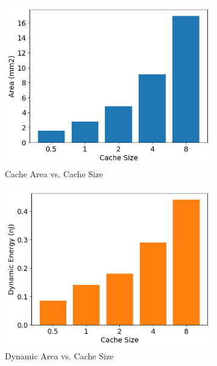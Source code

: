 \begin{figure}
    \begin{subfigure}[b]{0.5\textwidth}
        \includegraphics[width=\textwidth]{CacheArea.png}
        \caption{Cache Area vs. Cache Size}
    \end{subfigure}
    \begin{subfigure}[b]{0.5\textwidth}
        \includegraphics[width=\textwidth]{CacheEnergy.png}
        \caption{Dynamic Area vs. Cache Size}
    \end{subfigure}
    \begin{subfigure}[b]{0.5\textwidth}

\end{subfigure}
\end{figure}
